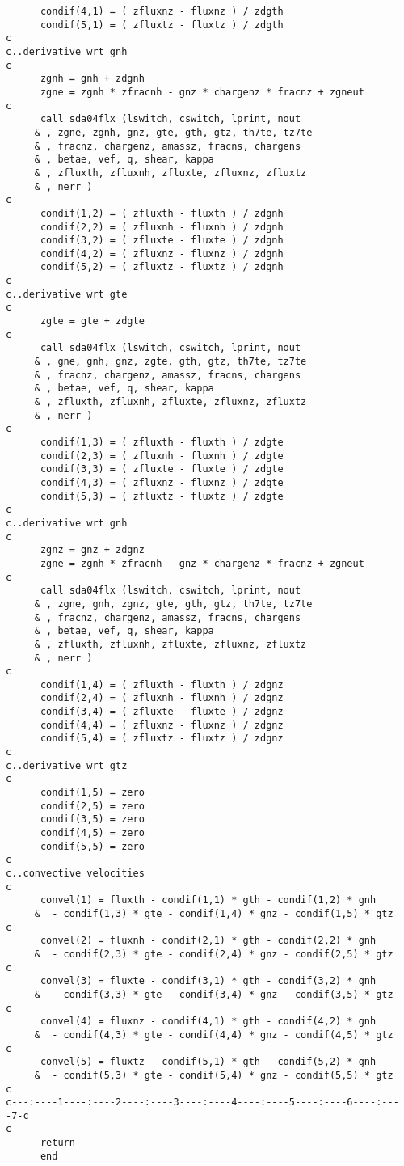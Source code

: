\begin{verbatim}
      condif(4,1) = ( zfluxnz - fluxnz ) / zdgth
      condif(5,1) = ( zfluxtz - fluxtz ) / zdgth
c
c..derivative wrt gnh
c
      zgnh = gnh + zdgnh
      zgne = zgnh * zfracnh - gnz * chargenz * fracnz + zgneut
c
      call sda04flx (lswitch, cswitch, lprint, nout
     & , zgne, zgnh, gnz, gte, gth, gtz, th7te, tz7te
     & , fracnz, chargenz, amassz, fracns, chargens
     & , betae, vef, q, shear, kappa
     & , zfluxth, zfluxnh, zfluxte, zfluxnz, zfluxtz
     & , nerr )
c
      condif(1,2) = ( zfluxth - fluxth ) / zdgnh
      condif(2,2) = ( zfluxnh - fluxnh ) / zdgnh
      condif(3,2) = ( zfluxte - fluxte ) / zdgnh
      condif(4,2) = ( zfluxnz - fluxnz ) / zdgnh
      condif(5,2) = ( zfluxtz - fluxtz ) / zdgnh
c
c..derivative wrt gte
c
      zgte = gte + zdgte
c
      call sda04flx (lswitch, cswitch, lprint, nout
     & , gne, gnh, gnz, zgte, gth, gtz, th7te, tz7te
     & , fracnz, chargenz, amassz, fracns, chargens
     & , betae, vef, q, shear, kappa
     & , zfluxth, zfluxnh, zfluxte, zfluxnz, zfluxtz
     & , nerr )
c
      condif(1,3) = ( zfluxth - fluxth ) / zdgte
      condif(2,3) = ( zfluxnh - fluxnh ) / zdgte
      condif(3,3) = ( zfluxte - fluxte ) / zdgte
      condif(4,3) = ( zfluxnz - fluxnz ) / zdgte
      condif(5,3) = ( zfluxtz - fluxtz ) / zdgte
c
c..derivative wrt gnh
c
      zgnz = gnz + zdgnz
      zgne = zgnh * zfracnh - gnz * chargenz * fracnz + zgneut
c
      call sda04flx (lswitch, cswitch, lprint, nout
     & , zgne, gnh, zgnz, gte, gth, gtz, th7te, tz7te
     & , fracnz, chargenz, amassz, fracns, chargens
     & , betae, vef, q, shear, kappa
     & , zfluxth, zfluxnh, zfluxte, zfluxnz, zfluxtz
     & , nerr )
c
      condif(1,4) = ( zfluxth - fluxth ) / zdgnz
      condif(2,4) = ( zfluxnh - fluxnh ) / zdgnz
      condif(3,4) = ( zfluxte - fluxte ) / zdgnz
      condif(4,4) = ( zfluxnz - fluxnz ) / zdgnz
      condif(5,4) = ( zfluxtz - fluxtz ) / zdgnz
c
c..derivative wrt gtz
c
      condif(1,5) = zero
      condif(2,5) = zero
      condif(3,5) = zero
      condif(4,5) = zero
      condif(5,5) = zero
c
c..convective velocities
c
      convel(1) = fluxth - condif(1,1) * gth - condif(1,2) * gnh
     &  - condif(1,3) * gte - condif(1,4) * gnz - condif(1,5) * gtz
c
      convel(2) = fluxnh - condif(2,1) * gth - condif(2,2) * gnh
     &  - condif(2,3) * gte - condif(2,4) * gnz - condif(2,5) * gtz
c
      convel(3) = fluxte - condif(3,1) * gth - condif(3,2) * gnh
     &  - condif(3,3) * gte - condif(3,4) * gnz - condif(3,5) * gtz
c
      convel(4) = fluxnz - condif(4,1) * gth - condif(4,2) * gnh
     &  - condif(4,3) * gte - condif(4,4) * gnz - condif(4,5) * gtz
c
      convel(5) = fluxtz - condif(5,1) * gth - condif(5,2) * gnh
     &  - condif(5,3) * gte - condif(5,4) * gnz - condif(5,5) * gtz
c
c---:----1----:----2----:----3----:----4----:----5----:----6----:----7-c
c
      return
      end
\end{verbatim}

